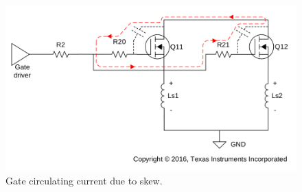 \begin{figure}[H]
	\centering
	\includegraphics[width=0.85\linewidth]{pictures/hardware/Driver_Board/skew.png}
	\caption{Gate circulating current due to skew.}
	\label{fig:skew_current}
\end{figure}